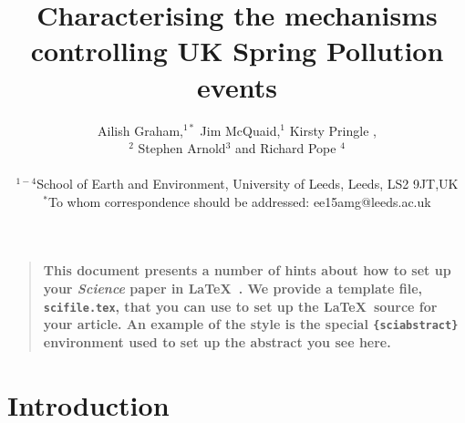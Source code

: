 \documentclass[10pt]{article}
\title{Characterising the mechanisms controlling UK Spring Pollution events}
\author
{Ailish Graham,$^{1\ast}$ Jim McQuaid,$^{1}$ Kirsty Pringle ,\\ $^{2}$ Stephen Arnold$^{3}$ and Richard Pope $^{4}$\\
\\
\normalsize{$^{1-4}$School of Earth and Environment, University of Leeds, Leeds, LS2 9JT,UK}\\
\normalsize{$^\ast$To whom correspondence should be addressed: ee15amg@leeds.ac.uk}
}
\date{}
\newenvironment{sciabstract}{%
\begin{quote} \bf}
{\end{quote}}
\begin{document}
 


\baselineskip24pt


\maketitle 




\begin{sciabstract}
  This document presents a number of hints about how to set up your
  {\it Science\/} paper in \LaTeX\ .  We provide a template file,
  \texttt{scifile.tex}, that you can use to set up the \LaTeX\ source
  for your article.  An example of the style is the special
  \texttt{\{sciabstract\}} environment used to set up the abstract you
  see here.
\end{sciabstract}





\section*{Introduction}
\end{document}
